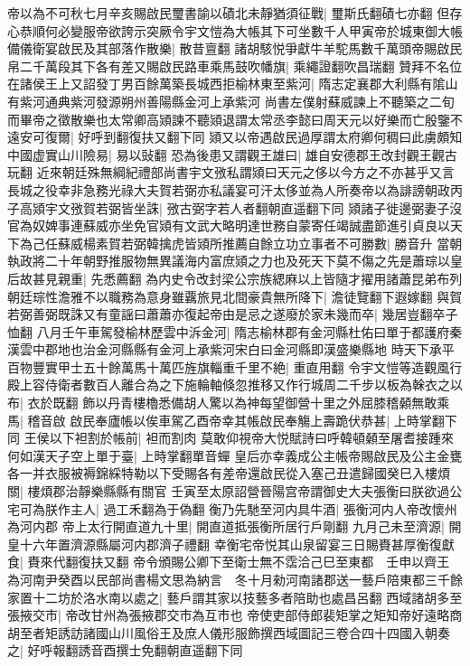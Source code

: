 帝以為不可秋七月辛亥賜啟民璽書諭以磧北未靜猶須征戰|{
	璽斯氏翻磧七亦翻}
但存心恭順何必變服帝欲誇示突厥令宇文愷為大帳其下可坐數千人甲寅帝於城東御大帳備儀衛宴啟民及其部落作散樂|{
	散昔亶翻}
諸胡駭悦爭獻牛羊駝馬數千萬頭帝賜啟民帛二千萬段其下各有差又賜啟民路車乘馬鼓吹幡旗|{
	乘繩證翻吹昌瑞翻}
贊拜不名位在諸侯王上又詔發丁男百餘萬築長城西拒榆林東至紫河|{
	隋志定襄郡大利縣有隂山有紫河通典紫河發源朔州善陽縣金河上承紫河}
尚書左僕射蘇威諫上不聽築之二旬而畢帝之徵散樂也太常卿高熲諫不聽熲退謂太常丞李懿曰周天元以好樂而亡殷鑒不遠安可復爾|{
	好呼到翻復扶又翻下同}
熲又以帝遇啟民過厚謂太府卿何稠曰此虜頗知中國虚實山川險易|{
	易以䜴翻}
恐為後患又謂觀王雄曰|{
	雄自安德郡王改封觀王觀古玩翻}
近來朝廷殊無綱紀禮部尚書宇文㢸私謂熲曰天元之侈以今方之不亦甚乎又言長城之役幸非急務光祿大夫賀若弼亦私議宴可汗太侈並為人所奏帝以為誹謗朝政丙子高熲宇文㢸賀若弼皆坐誅|{
	㢸古弼字若人者翻朝直遥翻下同}
熲諸子徙邊弼妻子沒官為奴婢事連蘇威亦坐免官熲有文武大略明達世務自蒙寄任竭誠盡節進引貞良以天下為己任蘇威楊素賀若弼韓擒虎皆熲所推薦自餘立功立事者不可勝數|{
	勝音升}
當朝執政將二十年朝野推服物無異議海内富庶熲之力也及死天下莫不傷之先是蕭琮以皇后故甚見親重|{
	先悉薦翻}
為内史令改封梁公宗族緦麻以上皆隨才擢用諸蕭昆弟布列朝廷琮性澹雅不以職務為意身雖覊旅見北間豪貴無所降下|{
	澹徒覽翻下遐嫁翻}
與賀若弼善弼既誅又有童謡曰蕭蕭亦復起帝由是忌之遂廢於家未幾而卒|{
	幾居豈翻卒子恤翻}
八月壬午車駕發榆林歷雲中泝金河|{
	隋志榆林郡有金河縣杜佑曰單于都護府秦漢雲中郡地也治金河縣縣有金河上承紫河宋白曰金河縣即漢盛樂縣地}
時天下承平百物豐實甲士五十餘萬馬十萬匹旌旗輜重千里不絶|{
	重直用翻}
令宇文愷等造觀風行殿上容侍衛者數百人離合為之下施輪軸倏忽推移又作行城周二千步以板為榦衣之以布|{
	衣於既翻}
飾以丹青樓櫓悉備胡人驚以為神每望御營十里之外屈膝稽顙無敢乘馬|{
	稽音啟}
啟民奉廬帳以俟車駕乙酉帝幸其帳啟民奉觴上壽跪伏恭甚|{
	上時掌翻下同}
王侯以下袒割於帳前|{
	袒而割肉}
莫敢仰視帝大悦賦詩曰呼韓頓顙至屠耆接踵來何如漢天子空上單于臺|{
	上時掌翻單音蟬}
皇后亦幸義成公主帳帝賜啟民及公主金甕各一并衣服被褥錦綵特勒以下受賜各有差帝還啟民從入塞己丑遣歸國癸巳入樓煩關|{
	樓煩郡治靜樂縣縣有關官}
壬寅至太原詔營晉陽宫帝謂御史大夫張衡曰朕欲過公宅可為朕作主人|{
	過工禾翻為于偽翻}
衡乃先馳至河内具牛酒|{
	張衡河内人帝改懷州為河内郡}
帝上太行開直道九十里|{
	開直道抵張衡所居行戶剛翻}
九月己未至濟源|{
	開皇十六年置濟源縣屬河内郡濟子禮翻}
幸衡宅帝悦其山泉留宴三日賜賚甚厚衡復獻食|{
	賚來代翻復扶又翻}
帝令頒賜公卿下至衛士無不霑洽己巳至東都　壬申以齊王為河南尹癸酉以民部尚書楊文思為納言　冬十月勑河南諸郡送一藝戶陪東都三千餘家置十二坊於洛水南以處之|{
	藝戶謂其家以技藝多者陪助也處昌呂翻}
西域諸胡多至張掖交市|{
	帝改甘州為張掖郡交市為互市也}
帝使吏部侍郎裴矩掌之矩知帝好遠略商胡至者矩誘訪諸國山川風俗王及庶人儀形服飾撰西域圖記三卷合四十四國入朝奏之|{
	好呼報翻誘音酉撰士免翻朝直遥翻下同}
